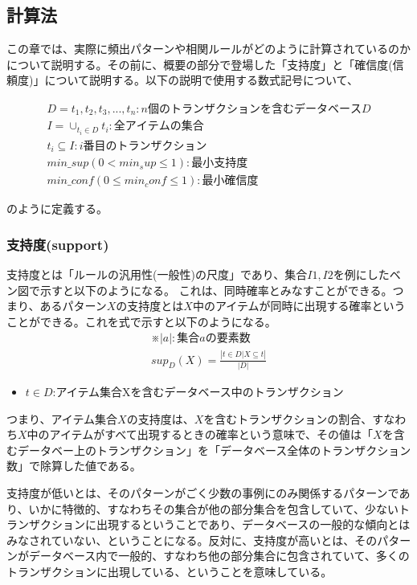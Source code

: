 \documentclass[dvipdfmx]{jsarticle}
\begin{document}
\subsection{計算法}
この章では、実際に頻出パターンや相関ルールがどのように計算されているのかについて説明する。その前に、概要の部分で登場した「支持度」と「確信度(信頼度)」について説明する。以下の説明で使用する数式記号について、
\begin{center}
  \begin{gather*}
    D = {t_{1}, t_{2}, t_{3},..., t_{n}}:n個のトランザクションを含むデータベースD\\
    I = \cup_{t_{i}\in D}t_{i}:全アイテムの集合 \\
    t_{i} \subseteq I:i番目のトランザクション \\
    min\_sup(0 < min_sup \le 1):最小支持度 \\
    min\_conf(0 \le min_conf \le 1):最小確信度
  \end{gather*}
\end{center}
のように定義する。
\subsubsection{支持度(support)}
支持度とは「ルールの汎用性(一般性)の尺度」であり、集合$I1, I2$を例にしたベン図で示すと以下のようになる。
これは、同時確率とみなすことができる。つまり、あるパターン$X$の支持度とは$X$中のアイテムが同時に出現する確率ということができる。これを式で示すと以下のようになる。
\begin{gather*}
  ※|a|:集合aの要素数\\
  sup_{D}(X) = \frac{|{t\in D|X\subseteq t}|}{|D|}
\end{gather*}
\begin{itemize}
  \item $t \in D$:アイテム集合Xを含むデータベース中のトランザクション
\end{itemize}
つまり、アイテム集合$X$の支持度は、$X$を含むトランザクションの割合、すなわち$X$中のアイテムがすべて出現するときの確率という意味で、その値は「$X$を含むデータベー上のトランザクション」を「データベース全体のトランザクション数」で除算した値である。\par
支持度が低いとは、そのパターンがごく少数の事例にのみ関係するパターンであり、いかに特徴的、すなわちその集合が他の部分集合を包含していて、少ないトランザクションに出現するということであり、データベースの一般的な傾向とはみなされていない、ということになる。反対に、支持度が高いとは、そのパターンがデータベース内で一般的、すなわち他の部分集合に包含されていて、多くのトランザクションに出現している、ということを意味している。
\end{document}
